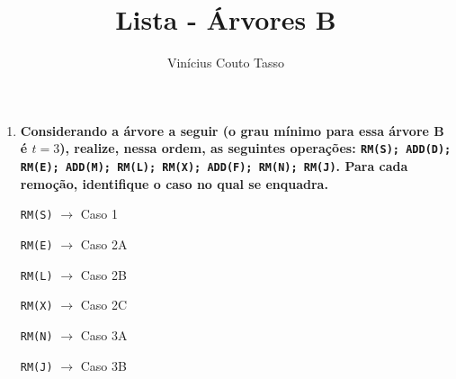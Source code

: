 \documentclass{article}
\title{Lista - Árvores B}
\author{Vinícius Couto Tasso}
\date{}
\begin{document}
\maketitle
         
\begin{enumerate}

\item \textbf{Considerando a árvore a seguir (o grau mínimo para essa árvore B é $t=3$), realize, nessa ordem, as seguintes operações: \texttt{RM(S); ADD(D); RM(E); ADD(M); RM(L); RM(X); ADD(F); RM(N); RM(J)}. Para cada remoção, identifique o caso no qual se enquadra.}



\texttt{RM(S)} $\rightarrow$ Caso 1



\texttt{RM(E)} $\rightarrow$ Caso 2A



\texttt{RM(L)} $\rightarrow$ Caso 2B



\texttt{RM(X)} $\rightarrow$ Caso 2C



\newpage

\texttt{RM(N)} $\rightarrow$ Caso 3A



\texttt{RM(J)} $\rightarrow$ Caso 3B



\end{enumerate}
\end{document}
